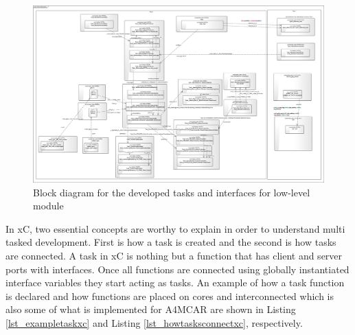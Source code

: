 \begin{figure}[!ht]
	\includegraphics[scale=0.21]{content/images/sysmlxmostasks.png}
	\caption{Block diagram for the developed tasks and interfaces for low-level module}
	\label{fig:sysmlxmostasks}
\end{figure}
\newpage
In xC, two essential concepts are worthy to explain in order to understand multi tasked development. First is how a task is created and the second is how tasks are connected. A task in xC is nothing but a function that has client and server ports with interfaces. Once all functions are connected using globally instantiated interface variables they start acting as tasks. An example of how a task function is declared and how functions are placed on cores and interconnected which is also some of what is implemented for A4MCAR are shown in Listing \ref{lst_exampletaskxc} and Listing \ref{lst_howtasksconnectxc}, respectively.





